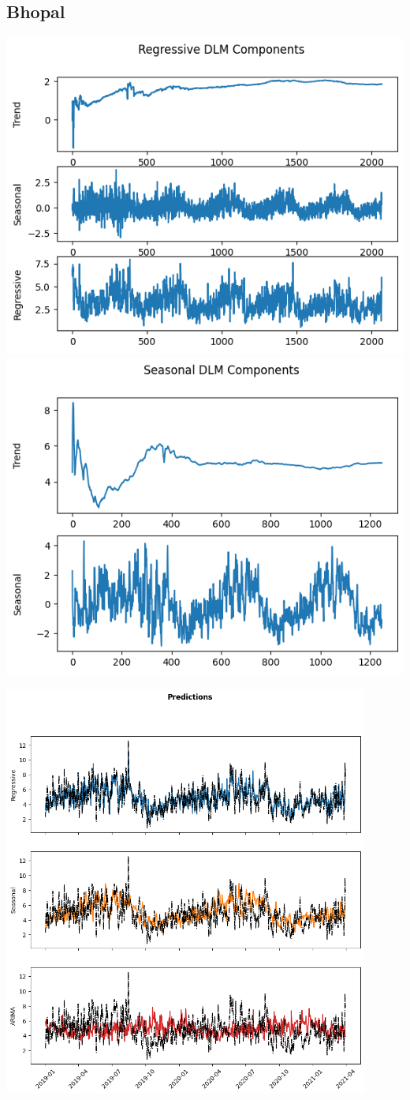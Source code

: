 \documentclass[a4paper,12pt]{article}
\begin{document}
\subsection{Bhopal}
\label{sec:org81224bf}
\begin{center}
\includegraphics[width=0.45\linewidth]{./images/bhopal/reg.png}
\includegraphics[width=0.45\linewidth]{./images/bhopal/seas.png}
\end{center}

\begin{center}
\includegraphics[width=0.9\textwidth]{./images/bhopal/pred.png}
\end{center}
\end{document}
